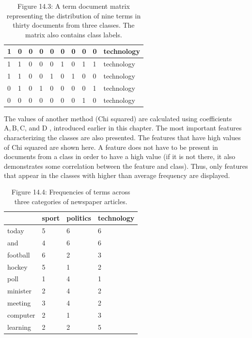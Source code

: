 \documentclass[10pt]{book}
\begin{document}
\begin{table}[h]
\begin{center}
\begin{tabular}{|l|l|l|l|l|l|l|l|l|l|}
\hline
1 & 0 & 0 & 0 & 0 & 0 & 0 & 0 & 0 & technology \\
\hline
1 & 1 & 0 & 0 & 0 & 1 & 0 & 1 & 1 & technology \\
\hline
1 & 1 & 0 & 0 & 1 & 0 & 1 & 0 & 0 & technology \\
\hline
0 & 1 & 0 & 1 & 0 & 0 & 0 & 0 & 1 & technology \\
\hline
0 & 0 & 0 & 0 & 0 & 0 & 0 & 1 & 0 & technology \\
\hline
\end{tabular}
\captionsetup{labelformat=empty}
\caption{Figure 14.3: A term document matrix representing the distribution of nine terms in thirty documents from three classes. The matrix also contains class labels.}
\end{center}
\end{table}

The values of another method (Chi squared) are calculated using coefficients $\mathrm{A}, \mathrm{B}, \mathrm{C}$, and D , introduced earlier in this chapter. The most important features characterizing the classes are also presented. The features that have high values of Chi squared are shown here. A feature does not have to be present in documents from a class in order to have a high value (if it is not there, it also demonstrates some correlation between the feature and class). Thus, only features that appear in the classes with higher than average frequency are displayed.

\begin{table}[h]
\begin{center}
\begin{tabular}{|l|l|l|l|}
\hline
 & sport & politics & technology \\
\hline
today & 5 & 6 & 6 \\
\hline
and & 4 & 6 & 6 \\
\hline
football & 6 & 2 & 3 \\
\hline
hockey & 5 & 1 & 2 \\
\hline
poll & 1 & 4 & 1 \\
\hline
minister & 2 & 4 & 2 \\
\hline
meeting & 3 & 4 & 2 \\
\hline
computer & 2 & 1 & 3 \\
\hline
learning & 2 & 2 & 5 \\
\hline
\end{tabular}
\captionsetup{labelformat=empty}
\caption{Figure 14.4: Frequencies of terms across three categories of newspaper articles.}
\end{center}
\end{table}
\end{document}
